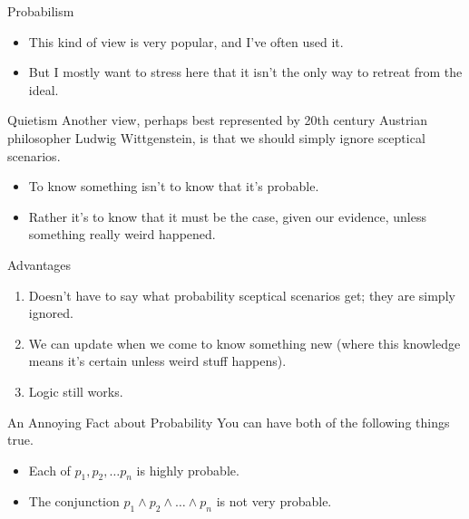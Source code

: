\documentclass[
  17pt,
  letterpaper,
  ignorenonframetext,
  aspectratio=169,
]{beamer}
\providecommand{\tightlist}{%
  \setlength{\itemsep}{0pt}\setlength{\parskip}{0pt}}\usepackage{longtable,booktabs,array}
\begin{document}
\begin{frame}{Probabilism}
\protect\hypertarget{probabilism-1}{}
\begin{itemize}[<+->]
\tightlist
\item
  This kind of view is very popular, and I've often used it.
\item
  But I mostly want to stress here that it isn't the only way to retreat
  from the ideal.
\end{itemize}
\end{frame}

\begin{frame}{Quietism}
\protect\hypertarget{quietism}{}
Another view, perhaps best represented by 20th century Austrian
philosopher Ludwig Wittgenstein, is that we should simply ignore
sceptical scenarios.

\begin{itemize}[<+->]
\tightlist
\item
  To know something isn't to know that it's probable.
\item
  Rather it's to know that it must be the case, given our evidence,
  unless something really weird happened.
\end{itemize}
\end{frame}

\begin{frame}{Advantages}
\protect\hypertarget{advantages}{}
\begin{enumerate}[<+->]
\tightlist
\item
  Doesn't have to say what probability sceptical scenarios get; they are
  simply ignored.
\item
  We can update when we come to know something new (where this knowledge
  means it's certain unless weird stuff happens).
\item
  Logic still works.
\end{enumerate}
\end{frame}

\begin{frame}{An Annoying Fact about Probability}
\protect\hypertarget{an-annoying-fact-about-probability}{}
You can have both of the following things true.

\begin{itemize}[<+->]
\tightlist
\item
  Each of \(p_1, p_2, \dots p_n\) is highly probable.
\item
  The conjunction \(p_1 \wedge p_2 \wedge \dots \wedge p_n\) is not very
  probable.
\end{itemize}
\end{frame}
\end{document}
